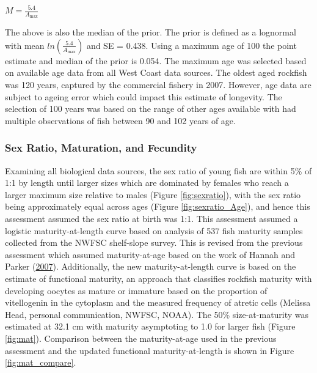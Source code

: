 \documentclass[12pt,]{article}
\begin{document}
\begin{centering}

$M=\frac{5.4}{A_{\text{max}}}$

\end{centering}

The above is also the median of the prior. The prior is defined as a
lognormal with mean \(ln(\frac{5.4}{A_{\text{max}}})\) and SE = 0.438.
Using a maximum age of 100 the point estimate and median of the prior is
0.054. The maximum age was selected based on available age data from all
West Coast data sources. The oldest aged rockfish was 120 years,
captured by the commercial fishery in 2007. However, age data are
subject to ageing error which could impact this estimate of longevity.
The selection of 100 years was based on the range of other ages
available with had multiple observations of fish between 90 and 102
years of age.

\subsubsection{Sex Ratio, Maturation, and
Fecundity}\label{sex-ratio-maturation-and-fecundity}

Examining all biological data sources, the sex ratio of young fish are
within 5\% of 1:1 by length until larger sizes which are dominated by
females who reach a larger maximum size relative to males (Figure
\ref{fig:sexratio}), with the sex ratio being approximately equal across
ages (Figure \ref{fig:sexratio_Age}), and hence this assessment assumed
the sex ratio at birth was 1:1. This assessment assumed a logistic
maturity-at-length curve based on analysis of 537 fish maturity samples
collected from the NWFSC shelf-slope survey. This is revised from the
previous assessment which assumed maturity-at-age based on the work of
Hannah and Parker
(\protect\hyperlink{ref-hannah_age-modulated_2007}{2007}). Additionally,
the new maturity-at-length curve is based on the estimate of functional
maturity, an approach that classifies rockfish maturity with developing
oocytes as mature or immature based on the proportion of vitellogenin in
the cytoplasm and the measured frequency of atretic cells (Melissa Head,
personal communication, NWFSC, NOAA). The 50\% size-at-maturity was
estimated at 32.1 cm with maturity asymptoting to 1.0 for larger fish
(Figure \ref{fig:mat}). Comparison between the maturity-at-age used in
the previous assessment and the updated functional maturity-at-length is
shown in Figure \ref{fig:mat_compare}.
\end{document}
